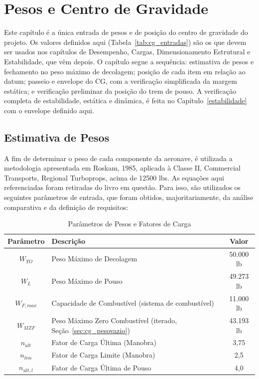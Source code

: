 \chapter{Pesos e Centro de Gravidade}
Este capítulo é a única entrada de pesos e de posição do centro de gravidade do projeto. Os valores definidos aqui (Tabela~\ref{tab:cg_entradas}) são os que devem ser usados nos capítulos de Desempenho, Cargas, Dimensionamento Estrutural e Estabilidade, que vêm depois. O capítulo segue a sequência: estimativa de pesos e fechamento no peso máximo de decolagem; posição de cada item em relação ao datum; passeio e envelope do CG, com a verificação simplificada da margem estática; e verificação preliminar da posição do trem de pouso. A verificação completa de estabilidade, estática e dinâmica, é feita no Capítulo~\ref{estabilidade} com o envelope definido aqui.

\section{Estimativa de Pesos}
A fim de determinar o peso de cada componente da aeronave, é utilizada a metodologia apresentada em Roskam, 1985, aplicada à Classe II, Commercial Transports, Regional Turboprops, acima de 12500 lbs. As equações aqui referenciadas foram retiradas do livro em questão. Para isso, são utilizados os seguintes parâmetros de entrada, que foram obtidos, majoritariamente, da análise comparativa e da definição de requisitos:

\begin{table}[H]
  \centering
  \linespread{1}\small
  \setlength{\tabcolsep}{4pt}
  \caption{Parâmetros de Pesos e Fatores de Carga}
  \label{tab:pesos_cargas}
  \begin{tabularx}{\textwidth}{c >{\raggedright\arraybackslash}X c}
    \toprule
    \textbf{Parâmetro} & \textbf{Descrição} & \textbf{Valor} \\
    \midrule
    $W_{TO}$ & Peso Máximo de Decolagem & 50.000 lb \\
    $W_{L}$ & Peso Máximo de Pouso & 49.273 lb \\
    $W_{F,max}$ & Capacidade de Combustível (sistema de combustível) & 11.000 lb \\
    $W_{MZF}$ & Peso Máximo Zero Combustível (iterado, Seção~\ref{sec:cg_pesovazio}) & 43.193 lb \\
    $n_{ult}$ & Fator de Carga Última (Manobra) & 3,75 \\
    $n_{lim}$ & Fator de Carga Limite (Manobra) & 2,5 \\
    $n_{ult,l}$ & Fator de Carga Última de Pouso & 4,0 \\
    \bottomrule
  \end{tabularx}
\end{table}

